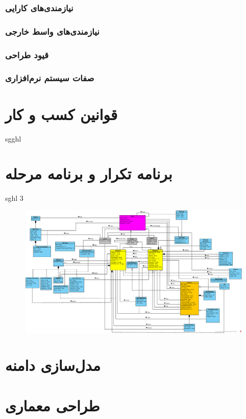 \documentclass[12pt]{article}
\begin{document}
	\subsubsection{نیازمندی‌های کارایی}
	\subsubsection{نیازمندی‌های واسط خارجی}
	\subsubsection{قیود طراحی}
	\subsubsection{صفات سیستم نرم‌افزاری}

	\newpage
	\section{قوانین کسب و کار}
	sgghl
	\newpage
	\section{برنامه تکرار و برنامه مرحله}
	sghl 3

	\begin{figure}
		\centering
		\includegraphics[width=1.5\linewidth]{files/Project_OOAD_Phase2_DiagramClass_V5_EnglishVersion}
		\caption{}
		\label{fig:projectooadphase2diagramclassv5englishversion}
	\end{figure}

	\newpage
	\section{مدل‌سازی دامنه}
	\newpage
	\section{طراحی معماری}
\end{document}
